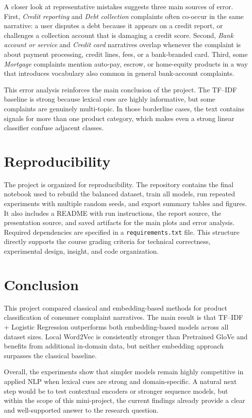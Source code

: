 \documentclass[10pt]{article}
\begin{document}
A closer look at representative mistakes suggests three main sources of error. First, \textit{Credit reporting} and \textit{Debt collection} complaints often co-occur in the same narrative: a user disputes a debt because it appears on a credit report, or challenges a collection account that is damaging a credit score. Second, \textit{Bank account or service} and \textit{Credit card} narratives overlap whenever the complaint is about payment processing, credit lines, fees, or a bank-branded card. Third, some \textit{Mortgage} complaints mention auto-pay, escrow, or home-equity products in a way that introduces vocabulary also common in general bank-account complaints.

This error analysis reinforces the main conclusion of the project. The TF--IDF baseline is strong because lexical cues are highly informative, but some complaints are genuinely multi-topic. In those borderline cases, the text contains signals for more than one product category, which makes even a strong linear classifier confuse adjacent classes.

\section{Reproducibility}
The project is organized for reproducibility. The repository contains the final notebook used to rebuild the balanced dataset, train all models, run repeated experiments with multiple random seeds, and export summary tables and figures. It also includes a README with run instructions, the report source, the presentation source, and saved artifacts for the main plots and error analysis. Required dependencies are specified in a \texttt{requirements.txt} file. This structure directly supports the course grading criteria for technical correctness, experimental design, insight, and code organization.

\section{Conclusion}
This project compared classical and embedding-based methods for product classification of consumer complaint narratives. The main result is that TF--IDF + Logistic Regression outperforms both embedding-based models across all dataset sizes. Local Word2Vec is consistently stronger than Pretrained GloVe and benefits from additional in-domain data, but neither embedding approach surpasses the classical baseline.

Overall, the experiments show that simpler models remain highly competitive in applied NLP when lexical cues are strong and domain-specific. A natural next step would be to test contextual encoders or stronger sequence models, but within the scope of this mini-project, the current findings already provide a clear and well-supported answer to the research question.
\end{document}

